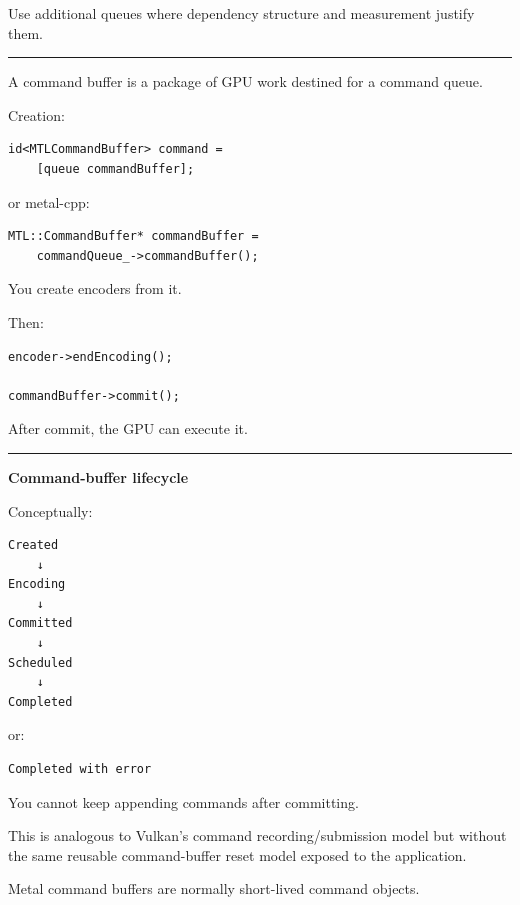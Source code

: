 Use additional queues where dependency structure and measurement justify them.

\begin{center}\rule{0.5\linewidth}{0.5pt}\end{center}

\textbf{}

A command buffer is a package of GPU work destined for a command queue.

Creation:

\begin{verbatim}
id<MTLCommandBuffer> command =
    [queue commandBuffer];
\end{verbatim}

or metal-cpp:

\begin{verbatim}
MTL::CommandBuffer* commandBuffer =
    commandQueue_->commandBuffer();
\end{verbatim}

You create encoders from it.

Then:

\begin{verbatim}
encoder->endEncoding();

commandBuffer->commit();
\end{verbatim}

After commit, the GPU can execute it.

\begin{center}\rule{0.5\linewidth}{0.5pt}\end{center}

\textbf{Command-buffer lifecycle}

Conceptually:

\begin{verbatim}
Created
    ↓
Encoding
    ↓
Committed
    ↓
Scheduled
    ↓
Completed
\end{verbatim}

or:

\begin{verbatim}
Completed with error
\end{verbatim}

You cannot keep appending commands after committing.

This is analogous to Vulkan's command recording/submission model but without the same reusable command-buffer reset model exposed to the application.

Metal command buffers are normally short-lived command objects.

